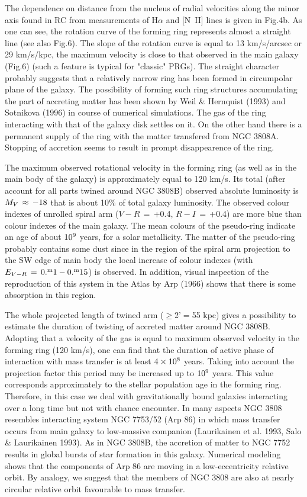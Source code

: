 The dependence on distance from the nucleus of radial velocities along 
the minor axis found in RC from measurements of H$\alpha$ and [N~II]
lines is given in Fig.4b. As one can see, the rotation curve of the
forming ring represents almost a straight line (see also Fig.6). The slope
of the rotation curve is equal to 13 km/s/arcsec or 29 km/s/kpc, 
the maximum velocity is close to that observed in the main galaxy (Fig.6)
(such a feature is typical for "classic" PRGs).
The straight character probably suggests that a relatively narrow ring
has been formed in circumpolar plane of the galaxy. 
The possibility of forming such ring structures accumulating
the part of accreting matter has been shown by Weil \& Hernquist (1993)
and Sotnikova (1996)
in course of numerical simulations. The gas of the ring
interacting with that of the galaxy disk settles on it. On the other
hand there is a permanent supply of the ring with the matter transfered 
from NGC 3808A. Stopping of accretion seems to result in prompt 
disappearence of the ring.  

The maximum observed rotational velocity in the forming ring (as well as
in the main body of the galaxy) is approximately equal to 120 km/s.
Its total (after account for all parts twined around NGC 3808B) observed
absolute luminosity is $M_{V}\,\approx\rm\,-18$ that is about 10\% of
total galaxy luminosity.  The observed colour indexes of unrolled spiral arm
($V-R\,=\,$+0.4, $R-I\,=\,$+0.4) are more blue than colour indexes of the
main galaxy. The mean colours of the pseudo-ring indicate an age of 
about $\rm 10^{9}$ years, for a solar metallicity. The matter of the
pseudo-ring probably contains some dust since in the region of the spiral arm
projection to the SW edge of main body the local
increase of colour indexes (with $E_{V-R}\,=\rm\,0.^{m}1-0.^{m}15$) is
observed. In addition, visual inspection of the reproduction of this system in
the Atlas by Arp (1966) shows that there is some absorption in this region.

The whole projected length of twined arm ($\geq$2'$=$55 kpc) gives a 
possibility
to estimate the duration of twisting of accreted matter around NGC 3808B. 
Adopting that a velocity of the gas is equal to maximum observed velocity
in the forming ring (120 km/s), one can find that the duration of active
phase of interaction with mass transfer is at least $\rm 4\times10^{8}$
years. Taking into account the projection factor this period may be 
increased up to $\rm 10^{9}$ years. This value corresponds approximately
to the stellar population age in the forming ring. Therefore, in this
case we deal with gravitationally bound galaxies interacting over a long
time but not with chance encounter. In many aspects NGC 3808
resembles interacting system NGC 7753/52 (Arp 86) in which mass
transfer occurs from main galaxy to low-massive companion (Laurikainen 
et al. 1993, Salo \& Laurikainen 1993). As in NGC 3808B, the accretion
of matter to NGC 7752 results in global bursts of star formation in this
galaxy. Numerical modeling shows that the components of Arp 86 are
moving in a low-eccentricity relative orbit. 
By analogy, we suggest that the members of NGC 3808
are also at nearly circular relative orbit favourable to mass transfer.

